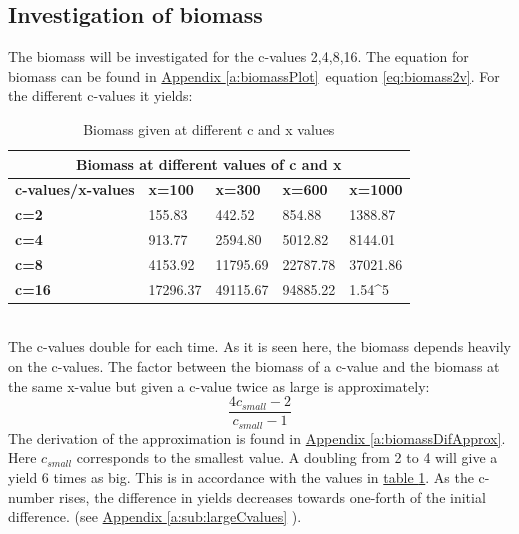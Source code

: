 \documentclass{article}
\numberwithin{equation}{section} %
\begin{document}
\subsection{Investigation of biomass}\label{sec:Ex1B}
The biomass will be investigated for the c-values 2,4,8,16. The equation for biomass can be found in \hyperref[a:biomassPlot]{Appendix \ref{a:biomassPlot}}\ equation \ref{eq:biomass2v}. For the different c-values it yields:\\
\begin{table}[h!]
    \centering
    \begin{tabular}{ |p{2.4cm}||p{2.4cm}|p{2.4cm}|p{2.4cm}|p{2.4cm}|  }
     \hline
     \multicolumn{5}{|c|}{Biomass at different values of c and x} \\
     \hline
     \textbf{c-values/x-values}& \textbf{x=100} &\textbf{x=300}&\textbf{x=600}&\textbf{x=1000}  \\
     \hline
     \hline
     \textbf{c=2}   & 155.83  &442.52& 854.88 & 1388.87\\
     \hline
     \textbf{c=4} &   913.77  & 2594.80 & 5012.82 & 8144.01\\
     \hline
     \textbf{c=8} & 4153.92 & 11795.69 & 22787.78 & 37021.86\\
     \hline
     \textbf{c=16}& 17296.37 & 49115.67& 94885.22 & 1.54\cdot10^5\\
     \hline
    \end{tabular}
    \caption{Biomass given at different c and x values}
    \label{tab:biomass2v}
\end{table}\\
The c-values double for each time. As it is seen here, the biomass depends heavily on the c-values. The factor between the biomass of a c-value and the biomass at the same x-value but given a c-value twice as large is approximately:
\begin{equation}
    \dfrac{4c_{small}-2}{c_{small}-1}
\end{equation}
The derivation of the approximation is found in \hyperref[a:biomassDifApprox]{Appendix \ref{a:biomassDifApprox}}\label{jmp:a:biomassDifApprox}. Here $c_{small}$ corresponds to the smallest value. A doubling from 2 to 4 will give a yield 6 times as big. This is in accordance with the values in \hyperref[tab:biomass2v]{table \ref{tab:biomass2v}}. As the c-number rises, the difference in yields decreases towards one-forth of the initial difference. (see \hyperref[a:sub:largeCvalues]{Appendix \ref{a:sub:largeCvalues}} ).
\end{document}

